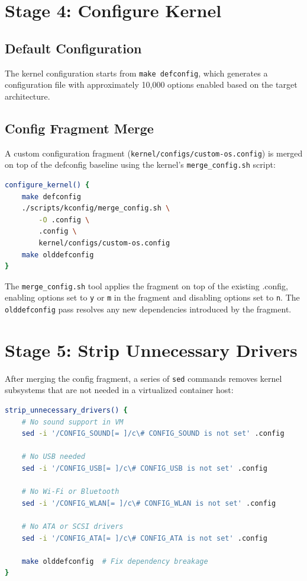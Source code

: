 \section{Stage 4: Configure Kernel}

\subsection{Default Configuration}

The kernel configuration starts from \texttt{make defconfig}, which
generates a configuration file with approximately 10,000 options enabled
based on the target architecture.

\subsection{Config Fragment Merge}

A custom configuration fragment (\texttt{kernel/configs/custom-os.config})
is merged on top of the defconfig baseline using the kernel's
\texttt{merge\_config.sh} script:

\begin{lstlisting}[language=bash]
configure_kernel() {
    make defconfig
    ./scripts/kconfig/merge_config.sh \
        -O .config \
        .config \
        kernel/configs/custom-os.config
    make olddefconfig
}
\end{lstlisting}

The \texttt{merge\_config.sh} tool applies the fragment on top of the
existing .config, enabling options set to \texttt{y} or \texttt{m} in
the fragment and disabling options set to \texttt{n}. The
\texttt{olddefconfig} pass resolves any new dependencies introduced by
the fragment.

\section{Stage 5: Strip Unnecessary Drivers}

After merging the config fragment, a series of \texttt{sed} commands
removes kernel subsystems that are not needed in a virtualized container
host:

\begin{lstlisting}[language=bash]
strip_unnecessary_drivers() {
    # No sound support in VM
    sed -i '/CONFIG_SOUND[= ]/c\# CONFIG_SOUND is not set' .config

    # No USB needed
    sed -i '/CONFIG_USB[= ]/c\# CONFIG_USB is not set' .config

    # No Wi-Fi or Bluetooth
    sed -i '/CONFIG_WLAN[= ]/c\# CONFIG_WLAN is not set' .config

    # No ATA or SCSI drivers
    sed -i '/CONFIG_ATA[= ]/c\# CONFIG_ATA is not set' .config

    make olddefconfig  # Fix dependency breakage
}
\end{lstlisting}

